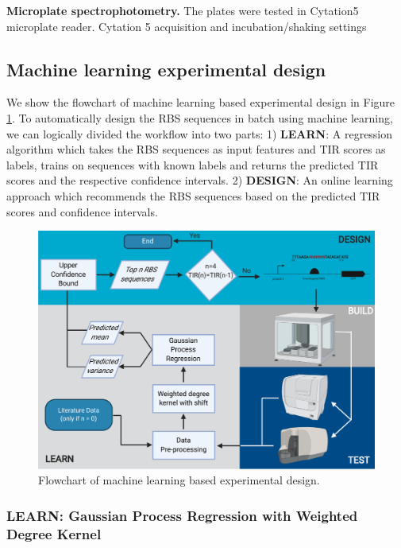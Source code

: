 \textbf{Microplate spectrophotometry.}
The plates were tested in Cytation5 microplate reader.
Cytation 5 acquisition and incubation/shaking settings

\subsection{Machine learning experimental design}

We show the flowchart of machine learning based experimental design in Figure \ref{fig: flowchart of machine learning based experimental design.}. 
To automatically design the RBS sequences in batch using machine learning, we can logically divided the workflow into two parts: 
1) \textbf{LEARN}: A regression algorithm which takes the RBS sequences as input features and TIR scores as labels, trains on sequences with known labels and returns the predicted TIR scores and the respective confidence intervals. 
2) \textbf{DESIGN}: An online learning approach which recommends the RBS sequences based on the predicted TIR scores and confidence intervals. 


\begin{figure}[h]
    \centering
    \includegraphics[scale=0.7]{plots/flowchart.pdf}
    \caption{Flowchart of machine learning based experimental design.}
    \label{fig: flowchart of machine learning based experimental design.}
\end{figure}

\subsubsection{LEARN: Gaussian Process Regression with Weighted Degree Kernel}

